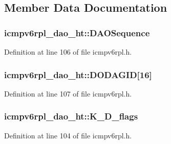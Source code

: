 \subsection{Member Data Documentation}
\subsubsection[{\texorpdfstring{D\+A\+O\+Sequence}{DAOSequence}}]{ icmpv6rpl\+\_\+dao\+\_\+ht\+::\+D\+A\+O\+Sequence}\hypertarget{structicmpv6rpl__dao__ht_ae250934e58471f9313bd5368dd0e77e7}{}\label{structicmpv6rpl__dao__ht_ae250934e58471f9313bd5368dd0e77e7}


Definition at line 106 of file icmpv6rpl.\+h.

\subsubsection[{\texorpdfstring{D\+O\+D\+A\+G\+ID}{DODAGID}}]{ icmpv6rpl\+\_\+dao\+\_\+ht\+::\+D\+O\+D\+A\+G\+ID\mbox{[}16\mbox{]}}\hypertarget{structicmpv6rpl__dao__ht_a0e7cb9d02da09d489a9a2d22727a8a8d}{}\label{structicmpv6rpl__dao__ht_a0e7cb9d02da09d489a9a2d22727a8a8d}


Definition at line 107 of file icmpv6rpl.\+h.

\subsubsection[{\texorpdfstring{K\+\_\+\+D\+\_\+flags}{K_D_flags}}]{ icmpv6rpl\+\_\+dao\+\_\+ht\+::\+K\+\_\+\+D\+\_\+flags}\hypertarget{structicmpv6rpl__dao__ht_a05e862b83a69fb551303a313a548a29f}{}\label{structicmpv6rpl__dao__ht_a05e862b83a69fb551303a313a548a29f}


Definition at line 104 of file icmpv6rpl.\+h.


